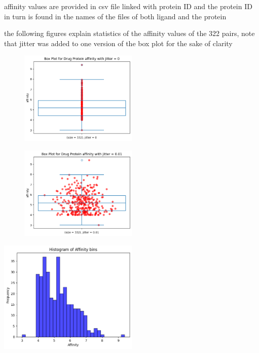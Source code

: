 \documentclass[11pt, a4paper]{article}
\begin{document}
        affinity values are provided in csv file linked with protein ID and the protein ID in turn is found in the names of the files of both ligand and the protein

        the following figures explain statistics of the affinity values of the 322 pairs, note that jitter was added to one version of the box plot for the sake of clarity
        
        \begin{figure}[h]
            \centering
            \includegraphics[width=0.5\textwidth]{boxplot1.png} 
            \caption{}
            \label{fig 8}
        \end{figure}
        
        \begin{figure}[h]
            \centering
            \includegraphics[width=0.5\textwidth]{boxplot2.png}
            \caption{}
            \label{fig 9}
        \end{figure}

        \begin{center}
            \includegraphics[width=0.5\textwidth]{histogram.png}
        \end{center}
\end{document}
